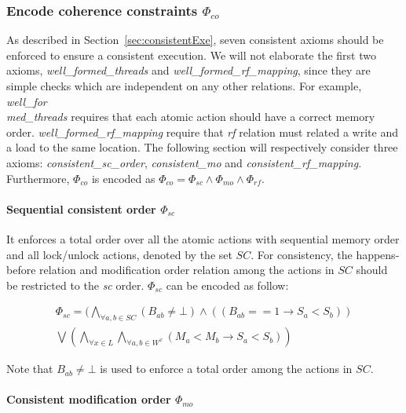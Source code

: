 \documentclass[preprint, numbers, 10pt]{sigplanconf}
\begin{document}
\subsubsection{Encode coherence constraints $\Phi_{co}$}

As described in Section~\ref{sec:consistentExe}, seven consistent axioms should be 
enforced to ensure a consistent execution. We will not elaborate the first two axioms, 
\textit{well\_formed\_threads} and \textit{well\_formed\_rf\_mapping}, since they
are simple checks which are independent on any other relations. For example, 
\textit{well\_for\\med\_threads} requires that each atomic action should have a correct
memory order. \textit{well\_formed\_rf\_mapping} require that \textit{rf} relation must related a write and 
a load to the same location. The following section will respectively consider three axioms:
\textit{consistent\_sc\_order}, \textit{consistent\_mo} and \textit{consistent\_rf\_mapping}.
Furthermore, $\Phi_{co}$ is encoded as $\Phi_{co}=\Phi_{sc}\wedge\Phi_{mo}\wedge\Phi_{rf}$. 

\paragraph{Sequential consistent order $\Phi_{sc}$}

It enforces a total order over all the atomic actions with sequential memory order and 
all lock/unlock actions, denoted by the set $SC$. 
For consistency, the happens-before relation and modification order relation among the actions
in $SC$ should be restricted to the \textit{sc} order. 
$\Phi_{sc}$ can be encoded as follow: 

\begin{equation}
\begin{aligned}
\Phi_{sc} = (\bigwedge_{\forall a,b\in SC}(B_{ab}\neq \bot)\wedge ((B_{ab}==1\rightarrow S_a<S_b)) \\
                   \bigvee(\bigwedge_{\forall x\in L}\bigwedge_{\forall a,b\in W^x} (M_a<M_b\rightarrow S_a<S_b))
\end{aligned}
\end{equation} 

Note that $B_{ab}\neq \bot$ is used to enforce a total order among the actions
in $SC$. 


\paragraph{Consistent modification order $\Phi_{mo}$}
\end{document}
